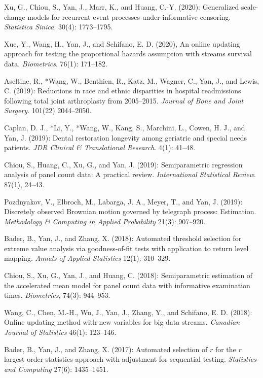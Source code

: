 \documentclass[Statistics]{vita}
\begin{document}
\begin{vita}
\begin{Publications}
\begin{RefereedJournalArticles}
  \item Xu, G., Chiou, S., Yan, J., Marr, K., and Huang, C.-Y. (2020): Generalized scale-change models for recurrent event processes under informative censoring. {\em Statistica Sinica\/}. 30(4): 1773--1795.
  \item *Xue, Y., Wang, H., Yan, J., and Schifano, E. D. (2020), An online updating approach for testing the proportional hazards assumption with streams survival data. {\em Biometrics\/}. 76(1): 171--182.
  \item Aseltine, R., *Wang, W., Benthien, R., Katz, M., Wagner, C., Yan, J., and Lewis, C. (2019): Reductions in race and ethnic disparities in hospital readmissions following total joint arthroplasty from 2005--2015. {\em Journal of Bone and Joint Surgery\/}. 101(22) 2044--2050. 
 \item Caplan, D. J., *Li, Y., *Wang, W., Kang, S., Marchini, L., Cowen, H. J., and Yan, J. (2019): Dental restoration longevity among geriatric and special needs patients. {\em JDR Clinical \& Translational Research\/}. 4(1): 41--48.
  \item Chiou, S., Huang, C., Xu, G., and Yan, J. (2019): Semiparametric regression analysis of panel count data: A practical review. {\em International Statistical Review\/}. 87(1), 24--43.
  \item Pozdnyakov, V., Elbroch, M., Labarga, J. A., Meyer, T., and Yan, J. (2019): Discretely observed Brownian motion governed by telegraph process: Estimation. {\em Methodology \& Computing in Applied Probability\/} 21(3): 907--920.
  \item *Bader, B., Yan, J., and Zhang, X. (2018): Automated threshold selection for extreme value analysis via goodness-of-fit tests with application to return level mapping. {\em Annals of Applied Statistics\/} 12(1): 310--329.
  \item Chiou, S., Xu, G., Yan, J., and Huang, C. (2018): Semiparametric estimation of the accelerated mean model for panel count data with informative examination times. {\em Biometrics\/}, 74(3): 944--953.
  \item *Wang, C., Chen, M.-H., Wu, J., Yan, J., Zhang, Y., and Schifano, E. D. (2018): Online updating method with new variables for big data streams. {\em Canadian Journal of Statistics\/} 46(1): 123--146.
 \item *Bader, B., Yan, J., and Zhang, X. (2017): Automated selection of $r$ for the $r$ largest order statistics approach with adjustment for sequential testing. {\em Statistics and Computing\/} 27(6): 1435--1451.

\end{RefereedJournalArticles}
\end{Publications}
\end{vita}
\end{document}
